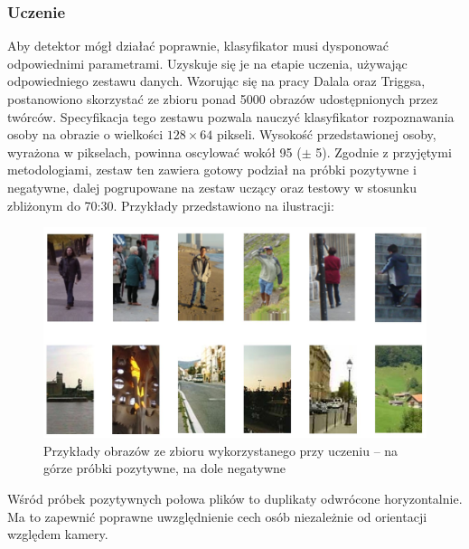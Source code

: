 
\subsubsection{Uczenie}

Aby detektor mógł działać poprawnie, klasyfikator musi dysponować odpowiednimi parametrami. 
Uzyskuje się je na etapie uczenia, używając odpowiedniego zestawu danych.
Wzorując się na pracy Dalala oraz Triggsa, postanowiono skorzystać ze zbioru ponad 5000 obrazów udostępnionych przez twórców. 
Specyfikacja tego zestawu pozwala nauczyć klasyfikator rozpoznawania osoby na obrazie o wielkości $128\times 64$ pikseli. 
Wysokość przedstawionej osoby, wyrażona w pikselach, powinna oscylować wokół 95 ($\pm$ 5). 
Zgodnie z przyjętymi metodologiami, zestaw ten zawiera gotowy podział na próbki pozytywne i negatywne, dalej pogrupowane na zestaw uczący oraz testowy w stosunku zbliżonym do 70:30. %
Przykłady przedstawiono na ilustracji:

\begin{figure}[h]
	\centering
	\captionsetup{justification=centering,margin=1cm}
	\includegraphics[width=14.5cm]{2_HOG_image_examples.jpg}
	\caption{Przykłady obrazów ze zbioru wykorzystanego przy uczeniu -- na górze próbki pozytywne, na dole negatywne}
	\label{fig:HOG_image_examples}
\end{figure}
Wśród próbek pozytywnych połowa plików to duplikaty odwrócone horyzontalnie. Ma to zapewnić poprawne uwzględnienie cech osób niezależnie od orientacji względem kamery.

